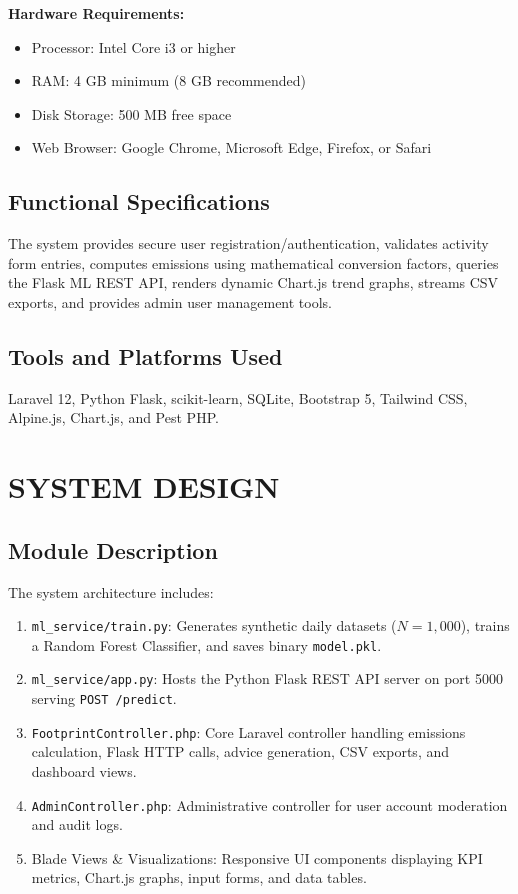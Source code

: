 \documentclass[12pt,a4paper]{report}
\begin{document}
\noindent \textbf{Hardware Requirements:}
\begin{itemize}
    \item Processor: Intel Core i3 or higher
    \item RAM: 4 GB minimum (8 GB recommended)
    \item Disk Storage: 500 MB free space
    \item Web Browser: Google Chrome, Microsoft Edge, Firefox, or Safari
\end{itemize}

\section{Functional Specifications}
The system provides secure user registration/authentication, validates activity form entries, computes emissions using mathematical conversion factors, queries the Flask ML REST API, renders dynamic Chart.js trend graphs, streams CSV exports, and provides admin user management tools.

\section{Tools and Platforms Used}
Laravel 12, Python Flask, scikit-learn, SQLite, Bootstrap 5, Tailwind CSS, Alpine.js, Chart.js, and Pest PHP.

\chapter{SYSTEM DESIGN}

\section{Module Description}
The system architecture includes:
\begin{enumerate}
    \item \texttt{ml\_service/train.py}: Generates synthetic daily datasets ($N=1,000$), trains a Random Forest Classifier, and saves binary \texttt{model.pkl}.
    \item \texttt{ml\_service/app.py}: Hosts the Python Flask REST API server on port 5000 serving \texttt{POST /predict}.
    \item \texttt{FootprintController.php}: Core Laravel controller handling emissions calculation, Flask HTTP calls, advice generation, CSV exports, and dashboard views.
    \item \texttt{AdminController.php}: Administrative controller for user account moderation and audit logs.
    \item Blade Views \& Visualizations: Responsive UI components displaying KPI metrics, Chart.js graphs, input forms, and data tables.
\end{enumerate}
\end{document}
